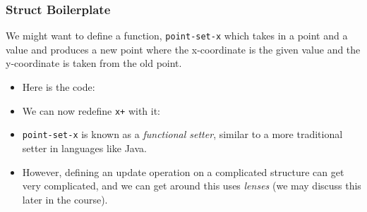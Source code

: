 \documentclass{beamer}
\begin{document}


\begin{frame}
  \frametitle{Struct Boilerplate}
  We might want to define a function, \texttt{point-set-x} which takes in a point and a value
  and produces a new point where the x-coordinate is the given value and the y-coordinate is taken from the old point.
  \begin{itemize}
  \item<2-> Here is the code: \pointSet
  \item<3-> We can now redefine \texttt{x+} with it:
    \xPlusNew
  \item<4-> \texttt{point-set-x} is  known as
    a \emph{functional setter}, similar to a more traditional setter
    in languages like Java.
  \item<5-> However, defining an update operation on a complicated
    structure can get very complicated, and we can get around
    this uses \emph{lenses} (we may discuss this later in the course).
  \end{itemize}
\end{frame}
\end{document}
